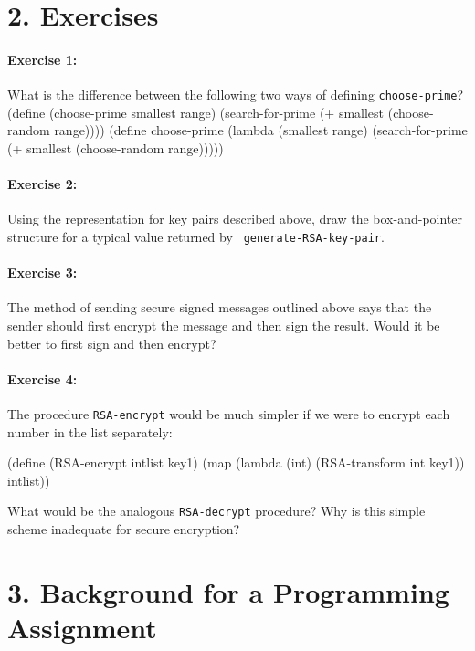 \pagebreak

\section{2. Exercises}

\paragraph{Exercise 1:}
What is the difference between the following two ways of defining {\tt choose-prime}?\\
\beginlisp
(define (choose-prime smallest range)
  (search-for-prime (+ smallest (choose-random range))))
\null
(define choose-prime
  (lambda (smallest range)
    (search-for-prime (+ smallest (choose-random range)))))
\endlisp

\paragraph{Exercise 2:}
Using the representation for key pairs described above, draw the
box-and-pointer structure for a typical value returned by {\tt
generate-RSA-key-pair}.

\paragraph{Exercise 3:}
The method of sending secure signed
messages outlined above says that the sender should first encrypt the
message and then sign the result.  Would it be better to first sign
and then encrypt?

\paragraph{Exercise 4:}

The procedure {\tt RSA-encrypt} would be much simpler if we were
to encrypt each number in the list separately:

\beginlisp
(define (RSA-encrypt intlist key1)
    (map (lambda (int) (RSA-transform int key1))
         intlist))
\endlisp

\noindent
What would be the analogous {\tt RSA-decrypt} procedure?  Why is this
simple scheme inadequate for secure encryption?

\vfill
\newpage
\section{3. Background for a Programming Assignment}

